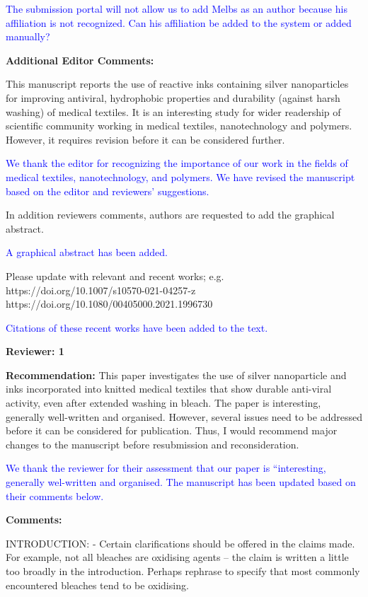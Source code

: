 \documentclass[12pt]{letter}
\newcommand{\blue}[1]{\textcolor{blue}{#1}} %
\begin{document}
\blue{The submission portal will not allow us to  add Melbs as an author because his affiliation is not recognized. Can his affiliation be added to the system or added manually?}

\textbf{Additional Editor Comments:}

This manuscript reports the use of reactive inks containing silver nanoparticles for improving antiviral, hydrophobic properties and durability (against harsh washing) of medical textiles. It is an interesting study for wider readership of scientific community working in medical textiles, nanotechnology and polymers. However, it requires revision before it can be considered further.

\blue{We thank the editor for recognizing the importance of our work in the fields of medical textiles, nanotechnology, and polymers.  We have revised the manuscript based on the editor and reviewers' suggestions.}

In addition reviewers comments, authors are requested to add the graphical abstract.

\blue{A graphical abstract has been added.}

Please update with relevant and recent works; e.g.
https://doi.org/10.1007/s10570-021-04257-z
https://doi.org/10.1080/00405000.2021.1996730

\blue{Citations of these recent works have been added to the text.}

\textbf{Reviewer: 1}

\textbf{Recommendation:} This paper investigates the use of silver nanoparticle and inks incorporated into knitted medical textiles that show durable anti-viral activity, even after extended washing in bleach. 
The paper is interesting, generally well-written and organised. 
However, several issues need to be addressed before it can be considered for publication. Thus, I would recommend major changes to the manuscript before resubmission and reconsideration.

\blue{We thank the reviewer for their assessment that our paper is ``interesting, generally wel-written and organised.  The manuscript has been updated based on their comments below.}

\textbf{Comments:}

INTRODUCTION:
- Certain clarifications should be offered in the claims made. For example, not all bleaches are oxidising agents – the claim is written a little too broadly in the introduction. Perhaps rephrase to specify that most commonly encountered bleaches tend to be oxidising.
\end{document}
